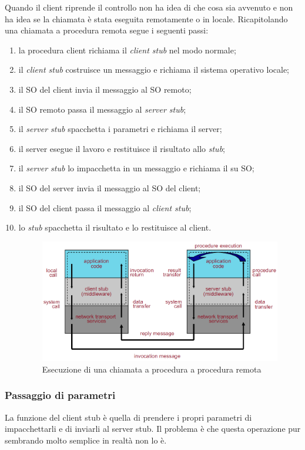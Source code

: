 Quando il client riprende il controllo non ha idea di che cosa sia avvenuto e non ha idea se la chiamata è stata eseguita remotamente o in locale.
Ricapitolando una chiamata a procedura remota segue i seguenti passi:
\begin{enumerate}
\item la procedura client richiama il \emph{client stub} nel modo normale;
\item il \emph{client stub} costruisce un messaggio e richiama il sistema operativo locale;
\item il SO del client invia il messaggio al SO remoto;
\item il SO remoto passa il messaggio al \emph{server stub};
\item il \emph{server stub} spacchetta i parametri e richiama il server;
\item il server esegue il lavoro e restituisce il risultato allo \emph{stub};
\item il \emph{server stub} lo impacchetta in un messaggio e richiama il su SO;
\item il SO del server invia il messaggio al SO del client;
\item il SO del client passa il messaggio al \emph{client stub};
\item lo \emph{stub} spacchetta il risultato e lo restituisce al client.
\begin{figure}
\centering
\includegraphics[scale=0.5]{img/execution.png}
\caption{Esecuzione di una chiamata a procedura a procedura remota}\label{img:executionrpc}
\end{figure}
\end{enumerate}
\subsubsection{Passaggio di parametri}
La funzione del client stub è quella di prendere i propri parametri di impacchettarli e di inviarli al server stub. Il problema è che questa operazione pur sembrando molto semplice in realtà non lo è.

